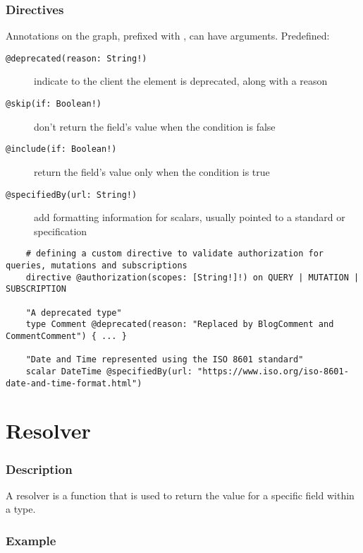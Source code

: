 \documentclass[notes]{beamer}
\begin{document}
\begin{frame}[fragile]
  \frametitle{Directives} Annotations on the graph, prefixed with \@,
  can have arguments. Predefined:
  \begin{description}
  \item[\texttt{@deprecated(reason: String!)}] indicate to the client
    the element is deprecated, along with a reason
  \item[\texttt{@skip(if: Boolean!)}] don't return the field's value
    when the condition is false
  \item[\texttt{@include(if: Boolean!)}] return the field's value only
    when the condition is true
  \item[\texttt{@specifiedBy(url: String!)}] add formatting
    information for scalars, usually pointed to a standard or
    specification
  \end{description}

  \begin{verbatim}
    # defining a custom directive to validate authorization for queries, mutations and subscriptions
    directive @authorization(scopes: [String!]!) on QUERY | MUTATION | SUBSCRIPTION
    
    "A deprecated type"
    type Comment @deprecated(reason: "Replaced by BlogComment and CommentComment") { ... }

    "Date and Time represented using the ISO 8601 standard"
    scalar DateTime @specifiedBy(url: "https://www.iso.org/iso-8601-date-and-time-format.html")
\end{verbatim}
\end{frame}


\section{Resolver}
\begin{frame}
  \frametitle{Description} A resolver is a function that is used to
  return the value for a specific field within a type.
\end{frame}

\begin{frame}
  \frametitle{Example}

\end{frame}
\end{document}
